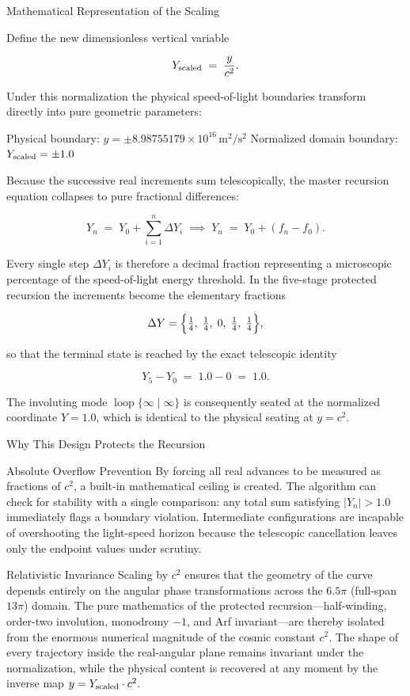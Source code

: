 Mathematical Representation of the Scaling

Define the new dimensionless vertical variable

\[
Y_{\rm scaled}
\;=\;
\frac{y}{c^2}.
\]

Under this normalization the physical speed-of-light boundaries transform directly into pure geometric parameters:

Physical boundary: \(y=\pm8.98755179\times10^{16}\,\mathrm{m}^2/\mathrm{s}^2\)
Normalized domain boundary: \(Y_{\rm scaled}=\pm1.0\)

Because the successive real increments sum telescopically, the master recursion equation collapses to pure fractional differences:

\[
Y_n
\;=\;
Y_0+\sum_{i=1}^{n}\Delta Y_i
\;\implies\;
Y_n
\;=\;
Y_0+(f_n-f_0).
\]

Every single step \(\Delta Y_i\) is therefore a decimal fraction representing a microscopic percentage of the speed-of-light energy threshold. In the five-stage protected recursion the increments become the elementary fractions

\[
\Delta Y=\Bigl\{\tfrac14,\;\tfrac14,\;0,\;\tfrac14,\;\tfrac14\Bigr\},
\]

so that the terminal state is reached by the exact telescopic identity

\[
Y_5-Y_0
\;=\;
1.0-0
\;=\;
1.0.
\]

The involuting mode \(\operatorname{loop}\{\infty\mid\infty\}\) is consequently seated at the normalized coordinate \(Y=1.0\), which is identical to the physical seating at \(y=c^2\).

Why This Design Protects the Recursion

Absolute Overflow Prevention  
By forcing all real advances to be measured as fractions of \(c^2\), a built-in mathematical ceiling is created. The algorithm can check for stability with a single comparison: any total sum satisfying \(|Y_n|>1.0\) immediately flags a boundary violation. Intermediate configurations are incapable of overshooting the light-speed horizon because the telescopic cancellation leaves only the endpoint values under scrutiny.

Relativistic Invariance  
Scaling by \(c^2\) ensures that the geometry of the curve depends entirely on the angular phase transformations across the \(6.5\pi\) (full-span \(13\pi\)) domain. The pure mathematics of the protected recursion—half-winding, order-two involution, monodromy \(-1\), and Arf invariant—are thereby isolated from the enormous numerical magnitude of the cosmic constant \(c^2\). The shape of every trajectory inside the real-angular plane remains invariant under the normalization, while the physical content is recovered at any moment by the inverse map \(y=Y_{\rm scaled}\cdot c^2\).

